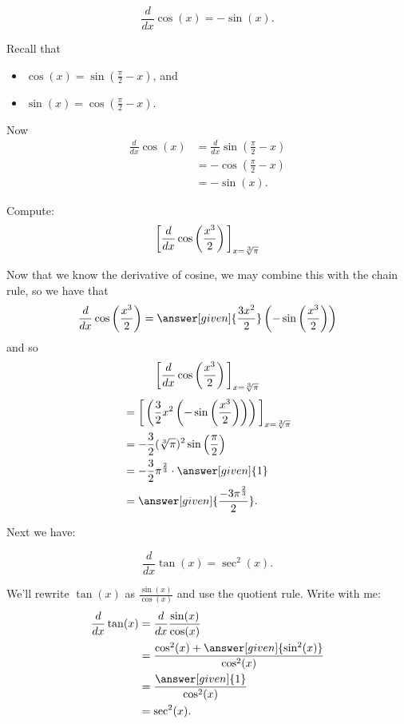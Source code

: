 \documentclass{ximera}
\begin{document}
\begin{theorem}
	\[ \frac{d}{dx} \cos(x) = -\sin(x).\]
	\begin{explanation}
	Recall that
	\begin{itemize}
		\item $\cos(x) = \sin\left(\frac{\pi}{2}-x\right)$, and
		\item $\sin(x) = \cos\left(\frac{\pi}{2}-x\right)$.
	\end{itemize}
	Now
	\begin{align*}
		\frac{d}{dx} \cos(x) &= \frac{d}{dx} \sin\left(\frac{\pi}{2}-x\right)\\
			&=-\cos\left(\frac{\pi}{2}-x\right) \\
			&= -\sin(x).
	\end{align*}
	\end{explanation}
\end{theorem}

\begin{example}
	Compute:
	\[ \bigg[ \frac{d}{dx} \cos \left( \frac{x^3}{2} \right) \bigg]_{x=\sqrt[3]{\pi}} \]
\begin{explanation}
Now that we know the derivative of cosine, we may combine this with the
chain rule, so we have that
\[
  \frac{d}{dx} \cos \left( \frac{x^3}{2} \right) = \answer[given]{\frac{3 x^2}{2}} \left(- \sin \left( \frac{x^3}{2} \right) \right)
\]
and so
\[
\bigg[ \frac{d}{dx} \cos \left( \frac{x^3}{2} \right) \bigg]_{x=\sqrt[3]{\pi}}
\]
\begin{align*}
  &= \eval{\left( \frac{3}{2} x^2 \left(- \sin \left( \frac{x^3}{2}
    \right) \right) \right)}_{x=\sqrt[3]{\pi}} \\
  &= - \frac{3}{2}(\sqrt[3]{\pi})^2 \sin \left( \frac{\pi}{2} \right) \\
  &= -\frac{3}{2} \pi^{\frac{2}{3}} \cdot \answer[given]{1} \\
  &=\answer[given]{\frac{-3 \pi^{\frac{2}{3}}}{2}}.
\end{align*}
\end{explanation}
\end{example}


Next we have:

\begin{theorem}
\[
\frac{d}{dx} \tan(x) = \sec^2(x).
\]

\begin{explanation}
We'll rewrite $\tan(x)$ as $\frac{\sin(x)}{\cos(x)}$ and use the
quotient rule. Write with me:
\begin{align*}
\frac{d}{dx}\tan(x) &= \frac{d}{dx}\frac{\sin(x)}{\cos(x)}\\
&=\frac{\cos^2(x) + \answer[given]{\sin^2(x)}}{\cos^2(x)}\\
&=\frac{\answer[given]{1}}{\cos^2(x)}\\
&=\sec^2(x).
\end{align*}
\end{explanation}
\end{theorem}
\end{document}
